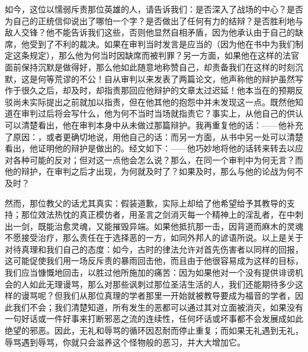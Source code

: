 如今，这位以懦弱斥责那位英雄的人，请告诉我们：是否深入了战场的中心？是否为自己的正统信仰说出了哪怕一个字？是否做出了任何有力的结辩？是否胜利地与敌人交锋？他不能告诉我们这些，否则他显然自相矛盾，因为他承认由于自己的缺席，他受到了不利的裁决。如果在审判当时发言是应当的（因为他在书中为我们制定这条规定），那么他为何当时因缺席而被判罪？另一方面，如果他在这样的法官面前保持沉默是做得好，那么他如此随意地称赞自己，却责备我们在这样的时刻沉默，这是何等荒谬的不公！自从审判以来发表了两篇论文，他声称他的辩护虽然写作于很久之后，却及时，却指责那回应他辩护的文章太过迟延！他本当在的预期反驳尚未实际提出之前就加以指责，但在他其他的抱怨中并未发现这一点。既然他知道在审判过后将会写什么，他为何不当时当场就指责它？事实上，从他自己的供认可以清楚看出，他在审判本身中从未做过那篇辩护。我再重复他的话：——他补充了原因：，或者更确切地说，用他自己的话：而另一方面，从书中另一处可以清楚看出，他证明他的辩护是做出的。经文如下：——他巧妙地将他的话转来转去以应对各种可能的反对；但对这一点他会怎么说？那么，在同一个审判中为何无言？而他的辩护，在审判之后才出现，为何就及时了？如果及时，那么与他的论战为何不及时？\par

然而，那位教父的话尤其真实：假装道歉，实际上却给了他希望给予其教导的支持；那位效法热忱的真正模仿者，用圣言之剑消灭每一个精神上的淫乱者，在中刺出一剑，既能治愈灵魂，又能摧毁异端。如果他抵抗那一击，因背道而麻木的灵魂不愿接受治疗，那么责任在于选择恶的一方，如同外邦人的谚语所说。以上是关于对待真理和我们自己的态度：如今，古时的律法允许对首先伤害者以同样的回报，这可能促使我们用一场反斥责的暴雨回击他，而且由于他很容易成为这样的目标，我们应当慷慨地回击，以胜过他所施加的痛苦：因为如果他对一个没有提供诽谤机会的人如此无理谩骂，那么对那些讽刺过那位圣洁生活的人，我们还能期待多少这样的谩骂呢？但我们从那位真理的学者那里一开始就被教导要成为福音的学者，因此我们不会；我们清楚知道，所有发生的恶都可以通过其对立面被消灭，如果没有一句好话或一件好事来打断邪恶之流的连续性，任何坏话或坏事都不会发展成如此绝望的邪恶。因此，无礼和辱骂的循环因忍耐而停止重复；而如果无礼遇到无礼，辱骂遇到辱骂，你就只会滋养这个怪物般的恶习，并大大增加它。\par

